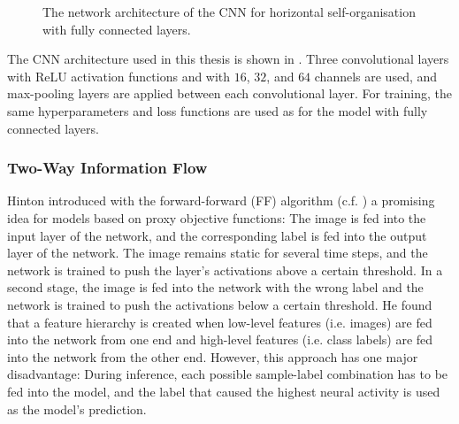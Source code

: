 \begin{figure}[h]
{
}
    \caption[Architecture of the CNN for horizontal self-organisation]{The network architecture of the CNN for horizontal self-organisation with fully connected layers.}
\end{figure}

The CNN architecture used in this thesis is shown in .
Three convolutional layers with ReLU activation functions and with $16$, $32$, and $64$ channels are used, and max-pooling layers are applied between each convolutional layer. For training, the same hyperparameters and loss functions are used as for the model with fully connected layers.


\subsubsection{Two-Way Information Flow}
Hinton  introduced with the forward-forward (FF) algorithm (c.f. ) a promising idea for models based on proxy objective functions: 
The image is fed into the input layer of the network, and the corresponding label is fed into the output layer of the network. The image remains static for several time steps, and the network is trained to push the layer's activations above a certain threshold. In a second stage, the image is fed into the network with the wrong label and the network is trained to push the activations below a certain threshold. He found that a feature hierarchy is created when low-level features (i.e. images) are fed into the network from one end and high-level features (i.e. class labels) are fed into the network from the other end. However, this approach has one major disadvantage: During inference, each possible sample-label combination has to be fed into the model, and the label that caused the highest neural activity is used as the model's prediction.

